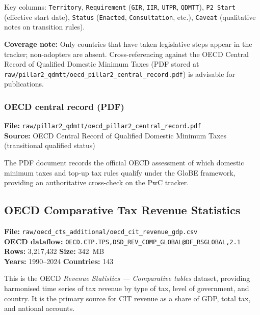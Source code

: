 \documentclass[11pt,a4paper]{article}
\begin{document}
Key columns: \texttt{Territory}, \texttt{Requirement} (\texttt{GIR}, \texttt{IIR}, \texttt{UTPR}, \texttt{QDMTT}), \texttt{P2 Start} (effective start date), \texttt{Status} (\texttt{Enacted}, \texttt{Consultation}, etc.), \texttt{Caveat} (qualitative notes on transition rules).

\noindent\textbf{Coverage note:} Only countries that have taken legislative steps appear in the tracker; non-adopters are absent.  Cross-referencing against the OECD Central Record of Qualified Domestic Minimum Taxes (PDF stored at \texttt{raw/pillar2\_qdmtt/oecd\_pillar2\_central\_record.pdf}) is advisable for publications.

\subsubsection{OECD central record (PDF)}

\textbf{File:} \texttt{raw/pillar2\_qdmtt/oecd\_pillar2\_central\_record.pdf}\\
\textbf{Source:} OECD Central Record of Qualified Domestic Minimum Taxes (transitional qualified status)

The PDF document records the official OECD assessment of which domestic minimum taxes and top-up tax rules qualify under the GloBE framework, providing an authoritative cross-check on the PwC tracker.


\subsection{OECD Comparative Tax Revenue Statistics}\label{sec:cts}

\textbf{File:} \texttt{raw/oecd\_cts\_additional/oecd\_cit\_revenue\_gdp.csv}\\
\textbf{OECD dataflow:} \texttt{OECD.CTP.TPS,DSD\_REV\_COMP\_GLOBAL@DF\_RSGLOBAL,2.1}\\
\textbf{Rows:} 3{,}217{,}432 \quad \textbf{Size:} 342~MB\\
\textbf{Years:} 1990--2024 \quad \textbf{Countries:} 143

This is the OECD \emph{Revenue Statistics --- Comparative tables} dataset, providing harmonised time series of tax revenue by type of tax, level of government, and country.  It is the primary source for CIT revenue as a share of GDP, total tax, and national accounts.
\end{document}
